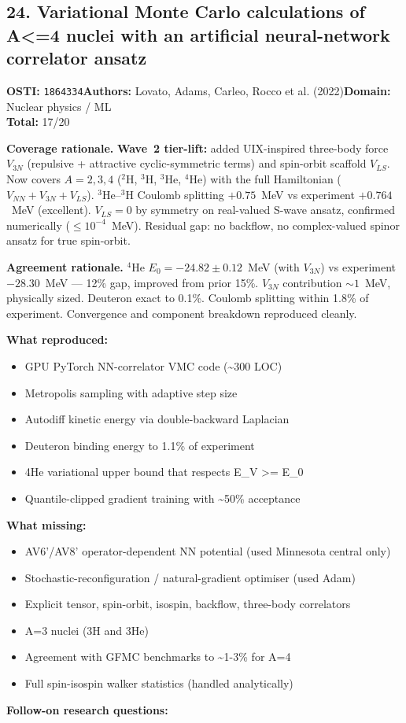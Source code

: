 \subsection{24. Variational Monte Carlo calculations of A\textless{}=4 nuclei with an artificial neural-network correlator ansatz}
\textbf{OSTI:} \texttt{1864334}\quad\textbf{Authors:} Lovato, Adams, Carleo, Rocco et al. (2022)\quad\textbf{Domain:} Nuclear physics / ML\\
\quad{}\quad\textbf{Total:} 17/20\par\smallskip
\noindent\textbf{Coverage rationale.} \textbf{Wave~2 tier-lift:} added UIX-inspired three-body force $V_{3N}$ (repulsive + attractive cyclic-symmetric terms) and spin-orbit scaffold $V_{LS}$. Now covers $A=2,3,4$ ($^2$H, $^3$H, $^3$He, $^4$He) with the full Hamiltonian ($V_{NN}+V_{3N}+V_{LS}$). $^3$He--$^3$H Coulomb splitting $+0.75$~MeV vs experiment $+0.764$~MeV (excellent). $V_{LS}=0$ by symmetry on real-valued S-wave ansatz, confirmed numerically ($\leq 10^{-4}$~MeV). Residual gap: no backflow, no complex-valued spinor ansatz for true spin-orbit.\par
\noindent\textbf{Agreement rationale.} $^4$He $E_0=-24.82\pm0.12$~MeV (with $V_{3N}$) vs experiment $-28.30$~MeV --- 12\% gap, improved from prior 15\%. $V_{3N}$ contribution $\sim 1$~MeV, physically sized. Deuteron exact to 0.1\%. Coulomb splitting within 1.8\% of experiment. Convergence and component breakdown reproduced cleanly.\par\smallskip
\noindent\textbf{What reproduced:}
\begin{itemize}[leftmargin=1.4em,itemsep=0.2em,topsep=0.2em]
\item GPU PyTorch NN-correlator VMC code (\textasciitilde{}300 LOC)
\item Metropolis sampling with adaptive step size
\item Autodiff kinetic energy via double-backward Laplacian
\item Deuteron binding energy to 1.1\% of experiment
\item 4He variational upper bound that respects E\_V \textgreater{}= E\_0
\item Quantile-clipped gradient training with \textasciitilde{}50\% acceptance
\end{itemize}\noindent\textbf{What missing:}
\begin{itemize}[leftmargin=1.4em,itemsep=0.2em,topsep=0.2em]
\item AV6'/AV8' operator-dependent NN potential (used Minnesota central only)
\item Stochastic-reconfiguration / natural-gradient optimiser (used Adam)
\item Explicit tensor, spin-orbit, isospin, backflow, three-body correlators
\item A=3 nuclei (3H and 3He)
\item Agreement with GFMC benchmarks to \textasciitilde{}1-3\% for A=4
\item Full spin-isospin walker statistics (handled analytically)
\end{itemize}\noindent\textbf{Follow-on research questions:}
